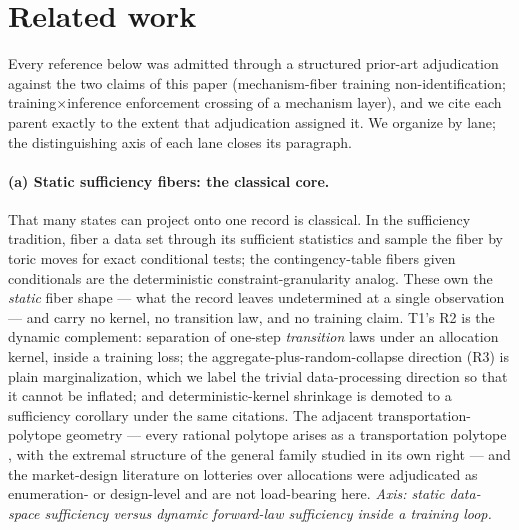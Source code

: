 \section{Related work}
\label{sec:related}

Every reference below was admitted through a structured prior-art
adjudication against the two claims of this paper (mechanism-fiber training
non-identification; training$\times$inference enforcement crossing of a
mechanism layer), and we cite each parent exactly to the extent that
adjudication assigned it. We organize by lane; the distinguishing axis of
each lane closes its paragraph.

\paragraph{(a) Static sufficiency fibers: the classical core.}
That many states can project onto one record is classical. In the
sufficiency tradition, \citet{diaconissturmfels1998} fiber a data set
through its sufficient statistics and sample the fiber by toric moves for
exact conditional tests; the contingency-table fibers given conditionals
\citep{fibers2014} are the deterministic constraint-granularity analog.
These own the \emph{static} fiber shape --- what the record leaves
undetermined at a single observation --- and carry no kernel, no transition
law, and no training claim. T1's R2 is the dynamic complement: separation of
one-step \emph{transition} laws under an allocation kernel, inside a
training loss; the aggregate-plus-random-collapse direction (R3) is plain
marginalization, which we label the trivial data-processing direction so
that it cannot be inflated; and deterministic-kernel shrinkage is demoted to
a sufficiency corollary under the same citations. The adjacent
transportation-polytope geometry --- every rational polytope arises as a
transportation polytope \citep{transportationpolytopes2004}, with the
extremal structure of the general family studied in its own right
\citep{extremepoints2024} --- and the market-design literature on lotteries
over allocations \citep{smartlotteries2026} were adjudicated as enumeration-
or design-level and are not load-bearing here. \emph{Axis: static data-space
sufficiency versus dynamic forward-law sufficiency inside a training loop.}

